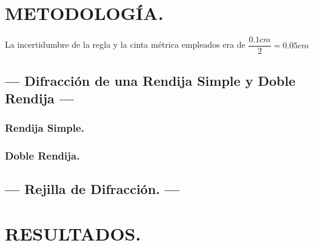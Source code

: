 \documentclass[12pt,a4paper]{article}
\begin{document}

\section{METODOLOGÍA.} %
La incertidumbre de la regla y la cinta métrica empleados era de $ \dfrac{0.1 cm}{2}=0.05 cm $
\subsection{--- Difracción de una Rendija Simple y Doble Rendija ---} %
\label{sub:difraccion_simple}

\subsubsection{Rendija Simple.} %
\label{subs:rendija_simple}

\subsubsection{Doble Rendija.} %
\label{subs:doble_rendija}


\subsection{--- Rejilla de Difracción. ---} %
\label{sub:reijlla_de_difraccion}


\section{RESULTADOS.} %
\end{document}
